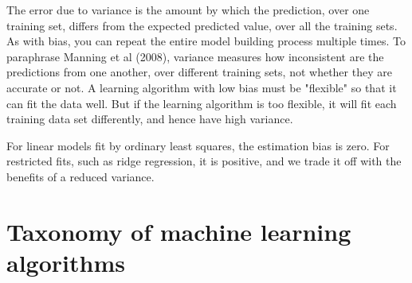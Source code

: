 \documentclass[12pt, letterpaper]{article}
\theoremstyle{definition}
\begin{document}
The error due to variance is the amount by which the prediction, over one training set, differs from the expected predicted value, over all the training sets. As with bias, you can repeat the entire model building process multiple times. To paraphrase Manning et al (2008), variance measures how inconsistent are the predictions from one another, over different training sets, not whether they are accurate or not.  A learning algorithm with low bias must be "flexible" so that it can fit the data well. But if the learning algorithm is too flexible, it will fit each training data set differently, and hence have high variance.

For linear models fit by ordinary least squares, the estimation bias is zero. For restricted fits, such as ridge regression, it is positive, and we trade it off with the benefits of a reduced variance.

\newpage
\section{Taxonomy of machine learning algorithms}
\end{document}
